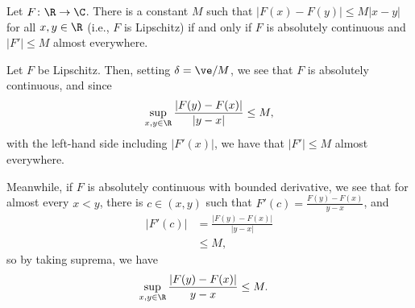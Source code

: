 \documentclass[10pt]{mypackage}
\begin{document}
\begin{exercise}[Exercise 37]
  Let $F\colon \R\rightarrow \C$. There is a constant $M$ such that $\left\vert F(x)-F(y) \right\vert \leq M\left\vert x-y \right\vert$ for all $x,y\in \R$ (i.e., $F$ is Lipschitz) if and only if $F$ is absolutely continuous and $\left\vert F' \right\vert \leq M$ almost everywhere.
\end{exercise}
\begin{solution}
  Let $F$ be Lipschitz. Then, setting $\delta = \ve / M$, we see that $F$ is absolutely continuous, and since
  \begin{align*}
    \sup_{x,y\in\R} \frac{\left\vert F(y)-F(x) \right\vert}{\left\vert y-x \right\vert} \leq M,
  \end{align*}
  with the left-hand side including $\left\vert F'(x) \right\vert$, we have that $\left\vert F' \right\vert \leq M$ almost everywhere.\newline

  Meanwhile, if $F$ is absolutely continuous with bounded derivative, we see that for almost every $x < y$, there is $c\in \left( x,y \right)$ such that $F'(c) = \frac{F(y)-F(x)}{y-x}$, and
  \begin{align*}
    \left\vert F'(c) \right\vert &= \frac{\left\vert F(y)-F(x) \right\vert}{\left\vert y-x \right\vert}\\
                                 &\leq M,
  \end{align*}
  so by taking suprema, we have
  \begin{align*}
    \sup_{x,y\in\R}\frac{\left\vert F(y)-F(x) \right\vert}{y-x} &\leq M.
  \end{align*}
  
\end{solution}
\end{document}
